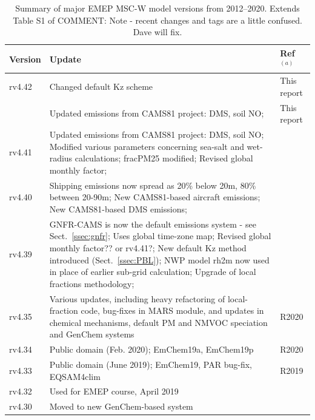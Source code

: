 \begin{table}
\begin{footnotesize}
\caption{Summary of major EMEP MSC-W model versions from 2012--2020.
Extends Table S1 of \citealt{Simpson:EMEP2012}
  COMMENT: Note - recent changes and tags are a little confused. Dave will fix.
}
\label{tab:Updates}
\centering
\begin{tabular}{lp{11cm}l}
\hline
Version & Update                                        & Ref$^{(a)}$   \\
\hline
rv4.42  & Changed default Kz scheme &  This report        \\
        & Updated emissions from CAMS81 project: DMS, soil NO;  &  This report        \\
rv4.41  & Updated emissions from CAMS81 project: DMS, soil NO; %
          Modified various parameters concerning sea-salt and wet-radius calculations; %
   fracPM25 modified;
          Revised global monthly factor;  %
        & \\
rv4.40  & Shipping emissions now spread as 20\% below 20m, 80\% between 20-90m;  
          New CAMS81-based aircraft emissions; %
          New CAMS81-based DMS emissions; %
        & \\
rv4.39 &
  GNFR-CAMS is now the default emissions system - see Sect.~\ref{ssec:gnfr};  %
          Uses global time-zone map;   %
          Revised global monthly factor?? or rv4.41?;  %
          New default Kz method introduced (Sect.~\ref{ssec:PBL});
          NWP model rh2m now used in place of earlier sub-grid calculation; %
          Upgrade of local fractions methodology;  %
        & \\
rv4.35  & Various updates, including heavy   
          refactoring of local-fraction code, bug-fixes in MARS module,
          and updates in chemical mechanisms, default PM and NMVOC speciation and
          GenChem systems     & R2020            \\
rv4.34  & Public domain (Feb. 2020); EmChem19a, EmChem19p      & R2020            \\
rv4.33  & Public domain (June 2019);
         EmChem19, PAR bug-fix, EQSAM4clim    & R2019            \\
rv4.32  & Used for EMEP course, April 2019    &    \\
rv4.30  & Moved to new GenChem-based system  &   \\

\end{tabular}
\end{footnotesize}
\end{table}
